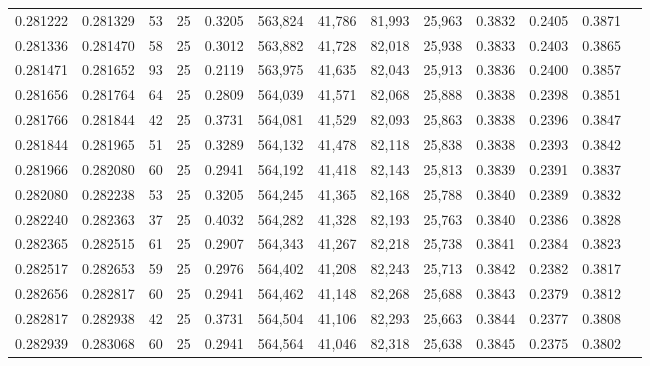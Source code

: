 \begin{tabular}{rrrrrrrrrrrrr}
0.281222 & 0.281329 &    53 &  25 &                                     0.3205 & 563,824 &  41,786 &  81,993 &  25,963 & 0.3832 & 0.2405 & 0.3871 \\
0.281336 & 0.281470 &    58 &  25 &                                     0.3012 & 563,882 &  41,728 &  82,018 &  25,938 & 0.3833 & 0.2403 & 0.3865 \\
0.281471 & 0.281652 &    93 &  25 &                                     0.2119 & 563,975 &  41,635 &  82,043 &  25,913 & 0.3836 & 0.2400 & 0.3857 \\
0.281656 & 0.281764 &    64 &  25 &                                     0.2809 & 564,039 &  41,571 &  82,068 &  25,888 & 0.3838 & 0.2398 & 0.3851 \\
0.281766 & 0.281844 &    42 &  25 &                                     0.3731 & 564,081 &  41,529 &  82,093 &  25,863 & 0.3838 & 0.2396 & 0.3847 \\
0.281844 & 0.281965 &    51 &  25 &                                     0.3289 & 564,132 &  41,478 &  82,118 &  25,838 & 0.3838 & 0.2393 & 0.3842 \\
0.281966 & 0.282080 &    60 &  25 &                                     0.2941 & 564,192 &  41,418 &  82,143 &  25,813 & 0.3839 & 0.2391 & 0.3837 \\
0.282080 & 0.282238 &    53 &  25 &                                     0.3205 & 564,245 &  41,365 &  82,168 &  25,788 & 0.3840 & 0.2389 & 0.3832 \\
0.282240 & 0.282363 &    37 &  25 &                                     0.4032 & 564,282 &  41,328 &  82,193 &  25,763 & 0.3840 & 0.2386 & 0.3828 \\
0.282365 & 0.282515 &    61 &  25 &                                     0.2907 & 564,343 &  41,267 &  82,218 &  25,738 & 0.3841 & 0.2384 & 0.3823 \\
0.282517 & 0.282653 &    59 &  25 &                                     0.2976 & 564,402 &  41,208 &  82,243 &  25,713 & 0.3842 & 0.2382 & 0.3817 \\
0.282656 & 0.282817 &    60 &  25 &                                     0.2941 & 564,462 &  41,148 &  82,268 &  25,688 & 0.3843 & 0.2379 & 0.3812 \\
0.282817 & 0.282938 &    42 &  25 &                                     0.3731 & 564,504 &  41,106 &  82,293 &  25,663 & 0.3844 & 0.2377 & 0.3808 \\
0.282939 & 0.283068 &    60 &  25 &                                     0.2941 & 564,564 &  41,046 &  82,318 &  25,638 & 0.3845 & 0.2375 & 0.3802 \\

\end{tabular}
